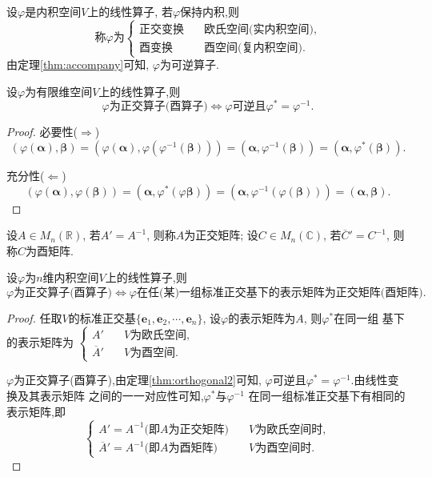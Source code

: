\begin{definition}
  设$\varphi$是内积空间$V$上的线性算子,
  若$\varphi$保持内积,则
  \[
    \text{称$\varphi$为}
    \begin{cases}
      \text{正交变换}\quad & \text{欧氏空间(实内积空间)},\\
      \text{酉变换}\quad & \text{酉空间(复内积空间)}.
    \end{cases}
  \]
  由定理\ref{thm:accompany}可知,
  $\varphi$为可逆算子.
\end{definition}

\begin{theorem}\label{thm:orthogonal2}
  设$\varphi$为有限维空间$V$上的线性算子,则
  \[
    \varphi\text{为正交算子(酉算子)} \Longleftrightarrow
    \varphi\text{可逆且}\varphi^*= \varphi^{-1}.
  \]
\end{theorem}

\begin{proof}
  必要性($\Rightarrow$)
  \[
    (\varphi(\bm{\alpha}),\bm{\beta}) =
    (\varphi(\bm{\alpha}),\varphi(\varphi^{-1}(\bm{\beta}))) =
    (\bm{\alpha},\varphi^{-1}(\bm{\beta})) =
    (\bm{\alpha},\varphi^*(\bm{\beta})).
  \]

  充分性($\Leftarrow$)
  \[
    (\varphi(\bm{\alpha}),\varphi(\bm{\beta})) =
    (\bm{\alpha},\varphi^*(\varphi{\bm{\beta}})) =
    (\bm{\alpha},\varphi^{-1}(\varphi(\bm{\beta}))) =
    (\bm{\alpha},\bm{\beta}).
  \]
\end{proof}

\begin{definition}
  设$A\in M_n(\mathbb{R})$, 若$A'=A^{-1}$,
  则称$A$为正交矩阵;
  设$C\in M_n(\mathbb{C})$, 若$\overline{C}'=C^{-1}$,
  则称$C$为酉矩阵.
\end{definition}

\begin{theorem}
  设$\varphi$为$n$维内积空间$V$上的线性算子,则
  \[
    \varphi\text{为正交算子(酉算子)} \Longleftrightarrow
    \varphi\text{在任(某)一组标准正交基下的表示矩阵为正交矩阵(酉矩阵)}.
  \]
\end{theorem}

\begin{proof}
  任取$V$的标准正交基$\{\bm{e}_1, \bm{e}_2, \cdots, \bm{e}_n\}$,
  设$\varphi$的表示矩阵为$A$, 则$\varphi^*$在同一组
  基下的表示矩阵为
  $\begin{cases} A' \quad & V\text{为欧氏空间},\\
    \overline{A}' \quad & V\text{为酉空间}. \end{cases}$

  $\varphi$为正交算子(酉算子),由定理\ref{thm:orthogonal2}可知,
  $\varphi$可逆且$\varphi^*=\varphi^{-1}$.由线性变换及其表示矩阵
  之间的一一对应性可知,$\varphi^*$与$\varphi^{-1}$
  在同一组标准正交基下有相同的表示矩阵,即
  \[\begin{cases}
    A' = A^{-1} \text{(即$A$为正交矩阵)}\quad & V\text{为欧氏空间时},\\
    \overline{A}' = A^{-1} \text{(即$A$为酉矩阵)} \quad & V\text{为酉空间时}.
  \end{cases}\]
\end{proof}

